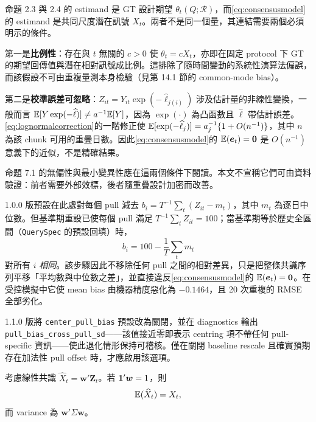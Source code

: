 \documentclass[12pt,a4paper,oneside]{article}
\begin{document}
\begin{remark}
\label{rem:bridge}
命題 2.3 與 2.4 的 estimand 是 GT 設計期望 $\theta_t(Q;\mathcal{R})$，而\cref{eq:consensusmodel}的 estimand 是共同尺度潛在訊號 $X_t$。兩者不是同一個量，其連結需要兩個必須明示的條件。

第一是\textbf{比例性}：存在與 $t$ 無關的 $c>0$ 使 $\theta_t=cX_t$，亦即在固定 protocol 下 GT 的期望回傳值與潛在相對訊號成比例。這排除了隨時間變動的系統性演算法偏誤，而該假設不可由重複量測本身檢驗（見第 14.1 節的 common-mode bias）。

第二是\textbf{校準誤差可忽略}：$Z_{it}=Y_{it}\exp(-\widehat\ell_{j(i)})$ 涉及估計量的非線性變換，一般而言 $\mathbb{E}[Y\exp(-\widehat\ell)]\neq a^{-1}\mathbb{E}[Y]$，因為 $\exp(\cdot)$ 為凸函數且 $\widehat\ell$ 帶估計誤差。\cref{eq:lognormalcorrection}的一階修正使 $\mathbb{E}[\exp(-\widehat\ell_j)]=a_j^{-1}\{1+O(n^{-1})\}$，其中 $n$ 為該 chunk 可用的重疊日數。因此\cref{eq:consensusmodel}的 $\mathbb{E}(\bm e_t)=\bm 0$ 是 $O(n^{-1})$ 意義下的近似，不是精確結果。

命題 7.1 的無偏性與最小變異性應在這兩個條件下閱讀。本文不宣稱它們可由資料驗證：前者需要外部效標，後者隨重疊設計加密而改善。
\end{remark}

\begin{remark}
\label{rem:centring}
1.0.0 版預設在此處對每個 pull 減去 $b_i=T^{-1}\sum_t(Z_{it}-m_t)$，其中 $m_t$ 為逐日中位數。但基準期重設已使每個 pull 滿足 $T^{-1}\sum_t Z_{it}=100$；當基準期等於歷史全區間（\texttt{QuerySpec} 的預設回填）時，
\begin{equation}
b_i=100-\frac{1}{T}\sum_t m_t
\label{eq:constantshift}
\end{equation}
對所有 $i$ \emph{相同}。該步驟因此不移除任何 pull 之間的相對差異，只是把整條共識序列平移「平均數與中位數之差」，並直接違反\cref{eq:consensusmodel}的 $\mathbb{E}(\bm e_t)=\bm 0$。在受控模擬中它使 mean bias 由機器精度惡化為 $-0.1464$，且 20 次重複的 RMSE 全部劣化。

1.1.0 版將 \texttt{center\_pull\_bias} 預設改為關閉，並在 diagnostics 輸出 \texttt{pull\_bias\_cross\_pull\_sd}——該值接近零即表示 centring 項不帶任何 pull-specific 資訊——使此退化情形保持可稽核。僅在關閉 baseline rescale 且確實預期存在加法性 pull offset 時，才應啟用該選項。
\end{remark}

考慮線性共識 $\widehat X_t=\bm w'\bm Z_t$。若 $\bm{1}'\bm w=1$，則
\begin{equation}
\mathbb{E}(\widehat X_t)=X_t,
\end{equation}
而 variance 為 $\bm w'\Sigma\bm w$。
\end{document}
